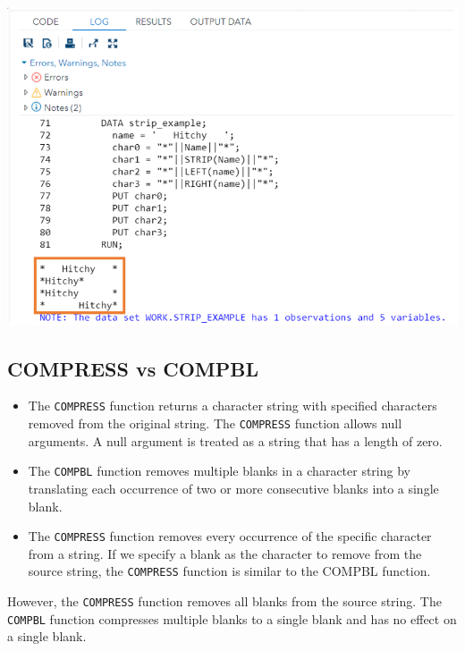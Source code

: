 \documentclass[
]{book}
\begin{document}
\begin{center}\includegraphics[width=1\linewidth]{img10/w10-stripLeftRight} \end{center}

\hypertarget{compress-vs-compbl}{%
\subsection{COMPRESS vs COMPBL}\label{compress-vs-compbl}}

\begin{itemize}
\item
  The \texttt{COMPRESS} function returns a character string with specified characters removed from the original string. The \texttt{COMPRESS} function allows null arguments. A null argument is treated as a string that has a length of zero.
\item
  The \texttt{COMPBL} function removes multiple blanks in a character string by translating each occurrence of two or more consecutive blanks into a single blank.
\item
  The \texttt{COMPRESS} function removes every occurrence of the specific character from a string. If we specify a blank as the character to remove from the source string, the \texttt{COMPRESS} function is similar to the COMPBL function.
\end{itemize}

However, the \texttt{COMPRESS} function removes all blanks from the source string. The \texttt{COMPBL} function compresses multiple blanks to a single blank and has no effect on a single blank.
\end{document}
